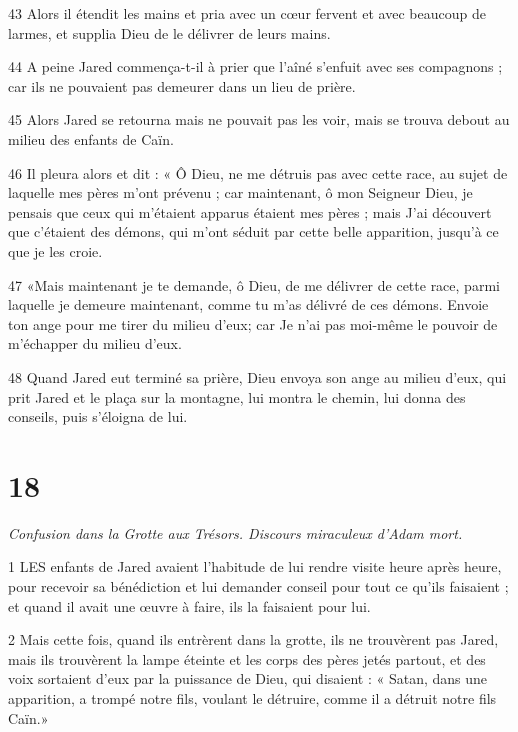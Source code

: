 \par 43 Alors il étendit les mains et pria avec un cœur fervent et avec beaucoup de larmes, et supplia Dieu de le délivrer de leurs mains.

\par 44 A peine Jared commença-t-il à prier que l'aîné s'enfuit avec ses compagnons ; car ils ne pouvaient pas demeurer dans un lieu de prière.

\par 45 Alors Jared se retourna mais ne pouvait pas les voir, mais se trouva debout au milieu des enfants de Caïn.

\par 46 Il pleura alors et dit : « Ô Dieu, ne me détruis pas avec cette race, au sujet de laquelle mes pères m'ont prévenu ; car maintenant, ô mon Seigneur Dieu, je pensais que ceux qui m'étaient apparus étaient mes pères ; mais J'ai découvert que c'étaient des démons, qui m'ont séduit par cette belle apparition, jusqu'à ce que je les croie.

\par 47 «Mais maintenant je te demande, ô Dieu, de me délivrer de cette race, parmi laquelle je demeure maintenant, comme tu m'as délivré de ces démons. Envoie ton ange pour me tirer du milieu d'eux; car Je n'ai pas moi-même le pouvoir de m'échapper du milieu d'eux.

\par 48 Quand Jared eut terminé sa prière, Dieu envoya son ange au milieu d'eux, qui prit Jared et le plaça sur la montagne, lui montra le chemin, lui donna des conseils, puis s'éloigna de lui.

\chapter{18}

\par \textit{Confusion dans la Grotte aux Trésors. Discours miraculeux d'Adam mort.}

\par 1 LES enfants de Jared avaient l'habitude de lui rendre visite heure après heure, pour recevoir sa bénédiction et lui demander conseil pour tout ce qu'ils faisaient ; et quand il avait une œuvre à faire, ils la faisaient pour lui.

\par 2 Mais cette fois, quand ils entrèrent dans la grotte, ils ne trouvèrent pas Jared, mais ils trouvèrent la lampe éteinte et les corps des pères jetés partout, et des voix sortaient d'eux par la puissance de Dieu, qui disaient : « Satan, dans une apparition, a trompé notre fils, voulant le détruire, comme il a détruit notre fils Caïn.»

